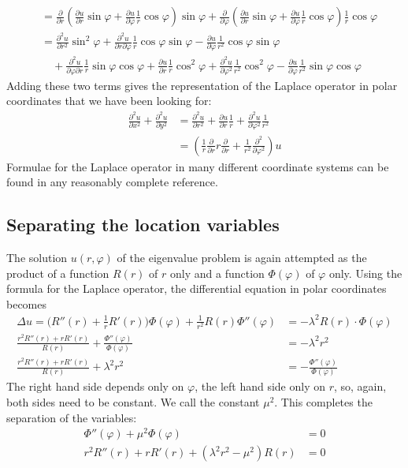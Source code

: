\begin{align*}
&=
\frac{\partial}{\partial r}
\left(
\frac{\partial u}{\partial r}
\sin\varphi
+
\frac{\partial u}{\partial\varphi}
\frac1r\cos\varphi
\right)
\sin\varphi
+
\frac{\partial}{\partial \varphi}
\left(
\frac{\partial u}{\partial r}
\sin\varphi
+
\frac{\partial u}{\partial\varphi}
\frac1r\cos\varphi
\right)
\frac1r\cos\varphi
\\
&=
\frac{\partial^2u}{\partial r^2}\sin^2\varphi
+\frac{\partial^2u}{\partial r\partial\varphi}\frac1r\cos\varphi\sin\varphi
-\frac{\partial u}{\partial\varphi}\frac1{r^2}\cos\varphi\sin\varphi
\\
&\quad
+
\frac{\partial^2u}{\partial\varphi\partial r}\frac1r\sin\varphi\cos\varphi
+\frac{\partial u}{\partial r}\frac1r\cos^2\varphi
+\frac{\partial^2u}{\partial \varphi^2}\frac1{r^2}\cos^2\varphi
-\frac{\partial u}{\partial \varphi}\frac1{r^2}\sin\varphi\cos\varphi
\end{align*}
Adding these two terms gives the representation of the Laplace operator
in polar coordinates that we have been looking for:
\begin{align*}
\frac{\partial^2u}{\partial x^2}+\frac{\partial^2u}{\partial y^2}
&=
\frac{\partial^2u}{\partial r^2}
+\frac{\partial u}{\partial r}\frac1r
+\frac{\partial^2u}{\partial\varphi^2}\frac1{r^2}
\\
&=
\left(\frac1r\frac{\partial}{\partial r}r\frac{\partial}{\partial r}+\frac1{r^2}\frac{\partial^2}{\partial \varphi^2}\right)u
\end{align*}
Formulae for the Laplace operator in many different coordinate systems
can be found in any reasonably complete reference.

\subsection{Separating the location variables}
The solution $u(r,\varphi)$ of the eigenvalue problem is again attempted
as the product of a function $R(r)$ of $r$ only and a function
$\Phi(\varphi)$ of $\varphi$ only.
Using the formula for the Laplace operator, the differential equation
in polar coordinates becomes
\begin{align*}
\Delta u=
\biggl(R''(r) + \frac1rR'(r)\biggr)\Phi(\varphi)
+\frac1{r^2}R(r)\Phi''(\varphi)&=-\lambda^2 R(r)\cdot\Phi(\varphi)\\
\frac{r^2R''(r)+rR'(r)}{R(r)}+\frac{\Phi''(\varphi)}{\Phi(\varphi)}
&=-\lambda^2 r^2
\\
\frac{r^2R''(r)+rR'(r)}{R(r)}+\lambda^2 r^2&=-\frac{\Phi''(\varphi)}{\Phi(\varphi)}
\end{align*}
The right hand side depends only on $\varphi$, the left hand side only on $r$,
so, again, both sides need to be constant.
We call the constant $\mu^2$.
This completes the separation of the variables:
\begin{align}
\Phi''(\varphi)+\mu^2\Phi(\varphi)&=0\label{phigleichung}\\
r^2R''(r)+rR'(r)+(\lambda^2 r^2-\mu^2)R(r)&=0\label{rgleichung}
\end{align}

